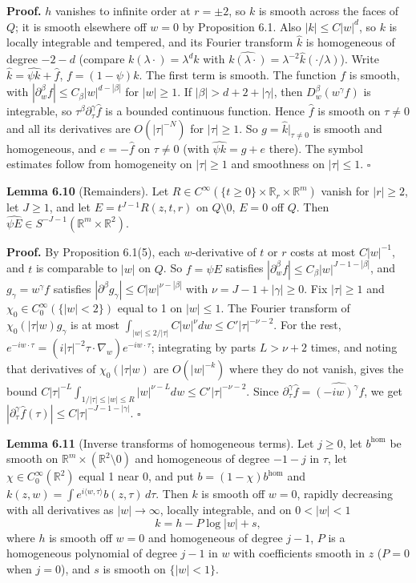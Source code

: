 \documentclass[
  11pt,
]{article}
\begin{document}
\textbf{Proof.} \(h\) vanishes to infinite order at \(r=\pm2\), so \(k\)
is smooth across the faces of \(Q\); it is smooth elsewhere off \(w=0\)
by Proposition 6.1. Also \(|k|\leq C|w|^d\), so \(k\) is locally
integrable and tempered, and its Fourier transform \(\widehat k\) is
homogeneous of degree \(-2-d\) (compare \(k(\lambda\cdot)=\lambda^dk\)
with
\(\widehat{k(\lambda\cdot)}=\lambda^{-2}\widehat k(\cdot/\lambda)\)).
Write \(\widehat k=\widehat{\psi k}+\widehat f\), \(f=(1-\psi)k\). The
first term is smooth. The function \(f\) is smooth, with
\(|\partial^\beta_wf|\leq C_\beta|w|^{d-|\beta|}\) for \(|w|\geq1\). If
\(|\beta|>d+2+|\gamma|\), then \(D^\beta_w(w^\gamma f)\) is integrable,
so \(\tau^\beta\partial_\tau^\gamma\widehat f\) is a bounded continuous
function. Hence \(\widehat f\) is smooth on \(\tau\neq0\) and all its
derivatives are \(O(|\tau|^{-N})\) for \(|\tau|\geq1\). So
\(g=\widehat k|_{\tau\neq0}\) is smooth and homogeneous, and
\(e=-\widehat f\) on \(\tau\neq0\) (with \(\widehat{\psi k}=g+e\)
there). The symbol estimates follow from homogeneity on \(|\tau|\geq1\)
and smoothness on \(|\tau|\leq1\). \(\square\)

\textbf{Lemma 6.10} (Remainders). Let
\(R\in C^\infty(\{t\geq0\}\times\mathbb R_r\times\mathbb R^m)\) vanish
for \(|r|\geq2\), let \(J\geq1\), and let \(E=t^{J-1}R(z,t,r)\) on
\(Q\setminus0\), \(E=0\) off \(Q\). Then
\(\widehat{\psi E}\in S^{-J-1}(\mathbb R^m\times\mathbb R^2)\).

\textbf{Proof.} By Proposition 6.1(5), each \(w\)-derivative of \(t\) or
\(r\) costs at most \(C|w|^{-1}\), and \(t\) is comparable to \(|w|\) on
\(Q\). So \(f=\psi E\) satisfies
\(|\partial_w^\beta f|\leq C_\beta|w|^{J-1-|\beta|}\), and
\(g_\gamma=w^\gamma f\) satisfies
\(|\partial^\beta g_\gamma|\leq C|w|^{\nu-|\beta|}\) with
\(\nu=J-1+|\gamma|\geq0\). Fix \(|\tau|\geq1\) and
\(\chi_0\in C_0^\infty(\{|w|<2\})\) equal to 1 on \(|w|\leq1\). The
Fourier transform of \(\chi_0(|\tau|w)g_\gamma\) is at most
\(\int_{|w|\leq2/|\tau|}C|w|^\nu dw\leq C'|\tau|^{-\nu-2}\). For the
rest,
\(e^{-iw\cdot\tau}=(i|\tau|^{-2}\tau\cdot\nabla_w)e^{-iw\cdot\tau}\);
integrating by parts \(L>\nu+2\) times, and noting that derivatives of
\(\chi_0(|\tau|w)\) are \(O(|w|^{-k})\) where they do not vanish, gives
the bound
\(C|\tau|^{-L}\int_{1/|\tau|\leq|w|\leq R}|w|^{\nu-L}dw\leq C'|\tau|^{-\nu-2}\).
Since \(\partial_\tau^\gamma\widehat f=\widehat{(-iw)^\gamma f}\), we
get
\(|\partial^\gamma_\tau\widehat f(\tau)|\leq C|\tau|^{-J-1-|\gamma|}\).
\(\square\)

\textbf{Lemma 6.11} (Inverse transforms of homogeneous terms). Let
\(j\geq0\), let \(b^{\mathrm{hom}}\) be smooth on
\(\mathbb R^m\times(\mathbb R^2\setminus0)\) and homogeneous of degree
\(-1-j\) in \(\tau\), let \(\chi\in C_0^\infty(\mathbb R^2)\) equal 1
near 0, and put \(b=(1-\chi)b^{\mathrm{hom}}\) and
\(k(z,w)=\int e^{i\langle w,\tau\rangle}b(z,\tau)\,d\tau\). Then \(k\)
is smooth off \(w=0\), rapidly decreasing with all derivatives as
\(|w|\to\infty\), locally integrable, and on \(0<|w|<1\) \[
k=h-P\log|w|+s,
\tag{6.12}
\] where \(h\) is smooth off \(w=0\) and homogeneous of degree \(j-1\),
\(P\) is a homogeneous polynomial of degree \(j-1\) in \(w\) with
coefficients smooth in \(z\) (\(P=0\) when \(j=0\)), and \(s\) is smooth
on \(\{|w|<1\}\).
\end{document}

